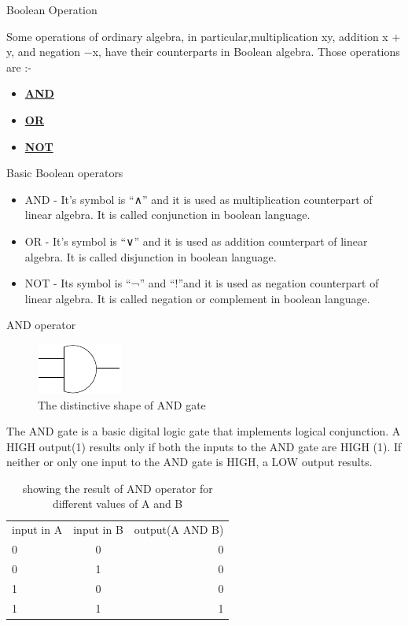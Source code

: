 \documentclass{beamer}
\begin{document}
\begin{frame}{Boolean Operation}

Some operations of ordinary algebra, in particular,multiplication xy, 
addition x + y, and negation −x, have their counterparts in Boolean algebra.
Those operations are :- 

\begin{itemize}
  \item \textbf{\underline{AND}}
  \item \textbf{\underline{OR}}
  \item \textbf{\underline{NOT}}
\end{itemize}
\end{frame}

\begin{frame}{Basic Boolean operators}
\begin{itemize}
 \item AND - It's symbol is “∧” and  it is used as multiplication counterpart of linear algebra.
	     It is called conjunction in boolean language.
 \item OR -  It's symbol is “∨” and  it is used as addition counterpart of linear algebra.
	     It is called disjunction in boolean language.
 \item NOT - Its symbol is “¬” and “!”and it is used as negation counterpart of linear algebra.
	     It is called negation or complement in boolean language.
\end{itemize}
\end{frame}

\begin{frame}{AND operator}
\begin{figure}
\centering
\caption{ The distinctive shape of AND gate}
\label{and:and}
\includegraphics{and}
\end{figure}


  The AND gate is a basic digital logic gate that implements logical conjunction. 
  A HIGH output(1) results only if both the inputs to the AND gate are HIGH (1). 
  If neither or only one input to the AND gate is HIGH, a LOW output results.

  \begin{table}
   \centering
   \begin{tabular}{|l c r|}
      input in A	&input in B	&output(A AND B) \\
      0			&0		&0		\\
      0			&1		&0		\\
      1			&0		&0		\\
      1			&1		&1
   \end{tabular}
\caption{showing the result of AND operator for different values of A and B}
   \end{table}
  
\end{frame}
\end{document}

